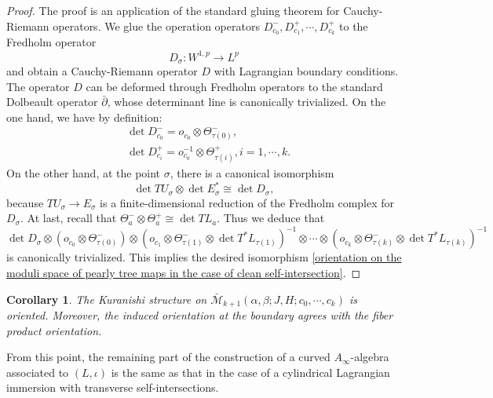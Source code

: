 \documentclass{amsart}
\newtheorem{corollary}[theorem]{Corollary}
\numberwithin{equation}{section}
\numberwithin{figure}{section}
\begin{document}
\begin{proof}
	The proof is an application of the standard gluing theorem for Cauchy-Riemann operators. We glue the operation operators $D_{c_{0}}^{-}, D_{c_{1}}^{+}, \cdots, D_{c_{k}}^{+}$ to the Fredholm operator
\begin{equation*}
D_{\sigma}: W^{1, p} \to L^{p}
\end{equation*}
and obtain a Cauchy-Riemann operator $D$ with Lagrangian boundary conditions. The operator $D$ can be deformed through Fredholm operators to the standard Dolbeault operator $\bar{\partial}$, whose determinant line is canonically trivialized. On the one hand, we have by definition:
\begin{align*}
&\det D_{c_{0}}^{-} = o_{c_{0}} \otimes \Theta_{\tau(0)}^{-},\\
&\det D_{c_{i}}^{+} = o_{c_{0}}^{-1} \otimes \Theta_{\tau(i)}^{+}, i = 1, \cdots, k.
\end{align*}
On the other hand, at the point $\sigma$, there is a canonical isomorphism
\begin{equation*}
\det TU_{\sigma} \otimes \det E_{\sigma}^{*} \cong \det D_{\sigma},
\end{equation*}
because $TU_{\sigma} \to E_{\sigma}$ is a finite-dimensional reduction of the Fredholm complex for $D_{\sigma}$. At last, recall that $\Theta_{a}^{-} \otimes \Theta_{a}^{+} \cong \det TL_{a}$. Thus we deduce that
\begin{equation*}
\det D_{\sigma} \otimes (o_{c_{0}} \otimes \Theta_{\tau(0)}^{-}) \otimes (o_{c_{1}} \otimes \Theta_{\tau(1)}^{-} \otimes \det T^{*}L_{\tau(1)})^{-1} \otimes \cdots \otimes (o_{c_{k}} \otimes \Theta_{\tau(k)}^{-} \otimes \det T^{*}L_{\tau(k)})^{-1}
\end{equation*}
is canonically trivialized. This implies the desired isomorphism \eqref{orientation on the moduli space of pearly tree maps in the case of clean self-intersection}. \par
\end{proof}

\begin{corollary}
	The Kuranishi structure on $\bar{\mathcal{M}}_{k+1}(\alpha, \beta; J, H; c_{0}, \cdots, c_{k})$ is oriented. Moreover, the induced orientation at the boundary agrees with the fiber product orientation.
\end{corollary}

	From this point, the remaining part of the construction of a curved $A_{\infty}$-algebra associated to $(L, \iota)$ is the same as that in the case of a cylindrical Lagrangian immersion with transverse self-intersections. \par
\end{document}
